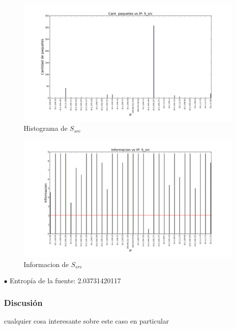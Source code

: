 \begin{figure}[H]\centering
    \includegraphics[width=\linewidth]{../imgs/red-entrepiso-dc_S_src_hist.png}
    \caption{Histograma de $S_{src}$}\label{fig:entrepiso-dc-src-hist}
\end{figure}

\begin{figure}[H]\centering
    \includegraphics[width=\linewidth]{../imgs/red-entrepiso-dc_S_src_info.png}
    \caption{Informacion de $S_{src}$}\label{fig:entrepiso-dc-src-info}
\end{figure}

$\bullet$ Entropía de la fuente: 2.03731420117

\subsubsection{Discusión}

cualquier cosa interesante sobre este caso en particular